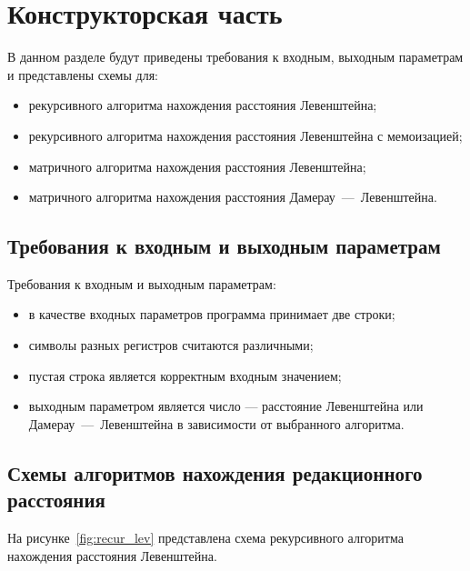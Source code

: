 \section{Конструкторская часть}

В данном разделе будут приведены требования к входным, выходным параметрам и представлены схемы для:
\begin{itemize}
    \item рекурсивного алгоритма нахождения расстояния Левенштейна;
    \item рекурсивного алгоритма нахождения расстояния Левенштейна с мемоизацией;
    \item матричного алгоритма нахождения расстояния Левенштейна;
    \item матричного алгоритма нахождения расстояния Дамерау~---~Левенштейна.
\end{itemize}

\subsection{Требования к входным и выходным параметрам}

Требования к входным и выходным параметрам:
\begin{itemize}
    \item в качестве входных параметров программа принимает две строки;
    \item символы разных регистров считаются различными;
    \item пустая строка является корректным входным значением;
    \item выходным параметром является число --- расстояние Левенштейна или Дамерау~---~Левенштейна в зависимости от выбранного алгоритма.
\end{itemize}

\subsection{Схемы алгоритмов нахождения редакционного расстояния}

На рисунке~\ref{fig:recur_lev} представлена схема рекурсивного алгоритма нахождения расстояния Левенштейна.

